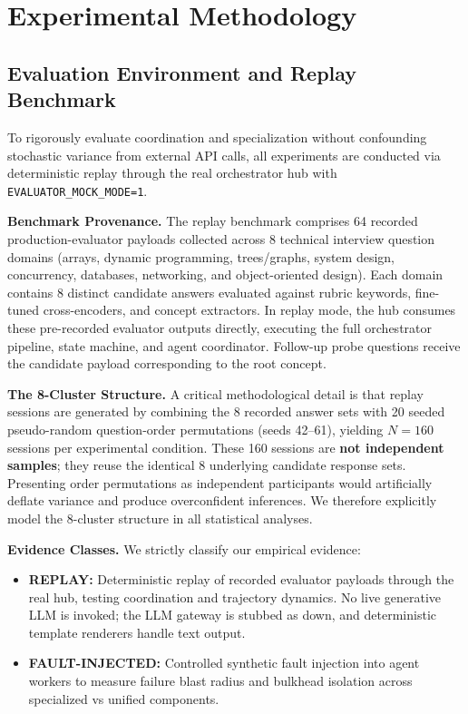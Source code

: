 \section{Experimental Methodology}\label{sec:method}

\subsection{Evaluation Environment and Replay Benchmark}
To rigorously evaluate coordination and specialization without confounding stochastic variance from external API calls, all experiments are conducted via deterministic replay through the real orchestrator hub with \texttt{EVALUATOR\_MOCK\_MODE=1}.

\noindent\textbf{Benchmark Provenance.} The replay benchmark comprises 64 recorded production-evaluator payloads collected across 8 technical interview question domains (arrays, dynamic programming, trees/graphs, system design, concurrency, databases, networking, and object-oriented design). Each domain contains 8 distinct candidate answers evaluated against rubric keywords, fine-tuned cross-encoders, and concept extractors. In replay mode, the hub consumes these pre-recorded evaluator outputs directly, executing the full orchestrator pipeline, state machine, and agent coordinator. Follow-up probe questions receive the candidate payload corresponding to the root concept.

\noindent\textbf{The 8-Cluster Structure.} A critical methodological detail is that replay sessions are generated by combining the 8 recorded answer sets with 20 seeded pseudo-random question-order permutations (seeds 42--61), yielding $N = 160$ sessions per experimental condition. These 160 sessions are \textbf{not independent samples}; they reuse the identical 8 underlying candidate response sets. Presenting order permutations as independent participants would artificially deflate variance and produce overconfident inferences. We therefore explicitly model the 8-cluster structure in all statistical analyses.

\noindent\textbf{Evidence Classes.} We strictly classify our empirical evidence:
\begin{itemize}
\item \textbf{REPLAY:} Deterministic replay of recorded evaluator payloads through the real hub, testing coordination and trajectory dynamics. No live generative LLM is invoked; the LLM gateway is stubbed as down, and deterministic template renderers handle text output.
\item \textbf{FAULT-INJECTED:} Controlled synthetic fault injection into agent workers to measure failure blast radius and bulkhead isolation across specialized vs unified components.
\end{itemize}

